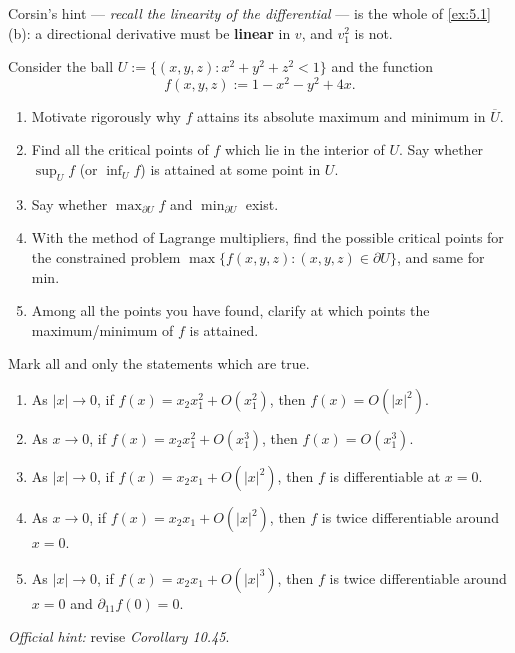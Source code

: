 \begin{remark}
Corsin's hint --- \textit{recall the linearity of the differential} --- is the whole of
\cref{ex:5.1}(b): a directional derivative must be \textbf{linear} in $v$, and $v_1^2$ is not.
\end{remark}

\begin{exercise}
\label{ex:5.2}
Consider the ball $U := \{(x,y,z) : x^2+y^2+z^2 < 1\}$ and the function
$$f(x,y,z) := 1 - x^2 - y^2 + 4x.$$
\begin{enumerate}[label=\textbf{\arabic*.}]
  \item Motivate rigorously why $f$ attains its absolute maximum and minimum in $\overline{U}$.
  \item Find all the critical points of $f$ which lie in the interior of $U$. Say whether
    $\sup_U f$ (or $\inf_U f$) is attained at some point in $U$.
  \item Say whether $\max_{\partial U} f$ and $\min_{\partial U}$ exist.
  \item With the method of Lagrange multipliers, find the possible critical points for the
    constrained problem $\max\{f(x,y,z) : (x,y,z) \in \partial U\}$, and same for min.
  \item Among all the points you have found, clarify at which points the maximum/minimum of $f$
    is attained.
\end{enumerate}
\end{exercise}

\begin{exercise}
\label{ex:5.3}
Mark all and only the statements which are true.
\begin{enumerate}[label=\textbf{(\alph*)}]
  \item As $|x| \to 0$, if $f(x) = x_2x_1^2 + O(x_1^2)$, then $f(x) = O(|x|^2)$.
  \item As $x \to 0$, if $f(x) = x_2x_1^2 + O(x_1^3)$, then $f(x) = O(x_1^3)$.
  \item As $|x| \to 0$, if $f(x) = x_2x_1 + O(|x|^2)$, then $f$ is differentiable at $x = 0$.
  \item As $x \to 0$, if $f(x) = x_2x_1 + O(|x|^2)$, then $f$ is twice differentiable around
    $x = 0$.
  \item As $|x| \to 0$, if $f(x) = x_2x_1 + O(|x|^3)$, then $f$ is twice differentiable around
    $x = 0$ and $\partial_{11}f(0) = 0$.
\end{enumerate}
\textit{Official hint:} revise \textit{Corollary 10.45}.
\end{exercise}

